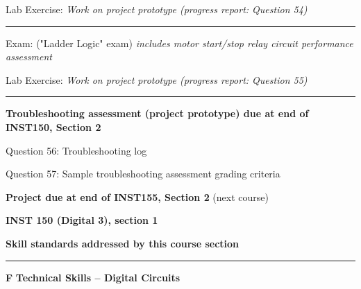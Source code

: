\hskip 10pt Lab Exercise: {\it Work on project prototype (progress report: Question 54)}
 
\vskip 10pt
\hrule \vskip 5pt
\noindent
{}

\hskip 10pt Exam: ("Ladder Logic" exam) {\it includes motor start/stop relay circuit performance assessment}
 
\hskip 10pt Lab Exercise: {\it Work on project prototype (progress report: Question 55)}
  
\vskip 10pt
\hrule \vskip 5pt
\noindent
{}

\hskip 10pt {\bf Troubleshooting assessment (project prototype) due at end of INST150, Section 2}

\hskip 10pt Question 56: Troubleshooting log
 
\hskip 10pt Question 57: Sample troubleshooting assessment grading criteria
 
\hskip 10pt {\bf Project due at end of INST155, Section 2} (next course)

\vskip 10pt







\vfil \eject

\centerline{\bf INST 150 (Digital 3), section 1} \bigskip 
 
\vskip 10pt

\noindent
{\bf Skill standards addressed by this course section}

\vskip 5pt

\hrule \vskip 10pt
\noindent
{}

\vskip 5pt

\medskip
\item{\bf F} {\bf Technical Skills -- Digital Circuits}
\medskip

\vskip 5pt

